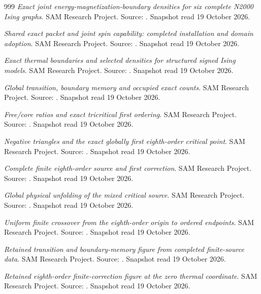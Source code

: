 \begin{thebibliography}{999}
 \emph{Exact joint energy-magnetization-boundary densities for six complete N2000 Ising graphs}. SAM Research Project. Source: . Snapshot read 19 October 2026.

 \emph{Shared exact packet and joint spin capability: completed installation and domain adoption}. SAM Research Project. Source: . Snapshot read 19 October 2026.

 \emph{Exact thermal boundaries and selected densities for structured signed Ising models}. SAM Research Project. Source: . Snapshot read 19 October 2026.

 \emph{Global transition, boundary memory and occupied exact counts}. SAM Research Project. Source: . Snapshot read 19 October 2026.

 \emph{Free/core ratios and exact tricritical first ordering}. SAM Research Project. Source: . Snapshot read 19 October 2026.

 \emph{Negative triangles and the exact globally first eighth-order critical point}. SAM Research Project. Source: . Snapshot read 19 October 2026.

 \emph{Complete finite eighth-order source and first correction}. SAM Research Project. Source: . Snapshot read 19 October 2026.

 \emph{Global physical unfolding of the mixed critical source}. SAM Research Project. Source: . Snapshot read 19 October 2026.

 \emph{Uniform finite crossover from the eighth-order origin to ordered endpoints}. SAM Research Project. Source: . Snapshot read 19 October 2026.

 \emph{Retained transition and boundary-memory figure from completed finite-source data}. SAM Research Project. Source: . Snapshot read 19 October 2026.

 \emph{Retained eighth-order finite-correction figure at the zero thermal coordinate}. SAM Research Project. Source: . Snapshot read 19 October 2026.


\end{thebibliography}

